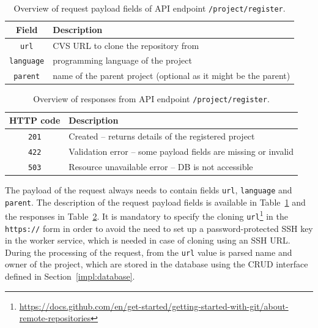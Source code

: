   \begin{table}[h]
        \centering
        \begin{tabular}{|c|l|}
          \hline
            Field & Description \\
          \hline
            \texttt{url} & CVS URL to clone the repository from \\
            \texttt{language} & programming language of the project \\
            \texttt{parent} & name of the parent project (optional as it might be the parent) \\
          \hline
        \end{tabular}
        \caption{Overview of request payload fields of API endpoint \texttt{/project/register}.}
        \label{tab:project-register-rq}
    \end{table}

  \begin{table}[h!]
        \centering
        \begin{tabular}{|c|l|}
          \hline
            HTTP code & Description \\
          \hline
            \texttt{201} & Created -- returns details of the registered project \\
            \texttt{422} & Validation error -- some payload fields are missing or invalid \\
            \texttt{503} & Resource unavailable error -- DB is not accessible \\
          \hline
        \end{tabular}
        \caption{Overview of responses from API endpoint \texttt{/project/register}.}
        \label{tab:project-register-rs}
    \end{table}

  The payload of the request always needs to contain fields \texttt{url}, \texttt{language} and \texttt{parent}.
  The description of the request payload fields is available in Table~\ref{tab:project-register-rq} and the responses
  in Table~\ref{tab:project-register-rs}. It is mandatory to specify the cloning
  \texttt{url}\footnote{\href{https://docs.github.com/en/get-started/getting-started-with-git/about-remote-repositories}{https://docs.github.com/en/get-started/getting-started-with-git/about-remote-repositories}}
  in the \texttt{https://} form in order to avoid the need to set up a password-protected SSH key in the worker service, which is needed
  in case of cloning using an SSH URL. During the processing of the request, from the \texttt{url} value is parsed name and owner
  of the project, which are stored in the database using the CRUD interface defined in Section~\ref{impl:database}.

